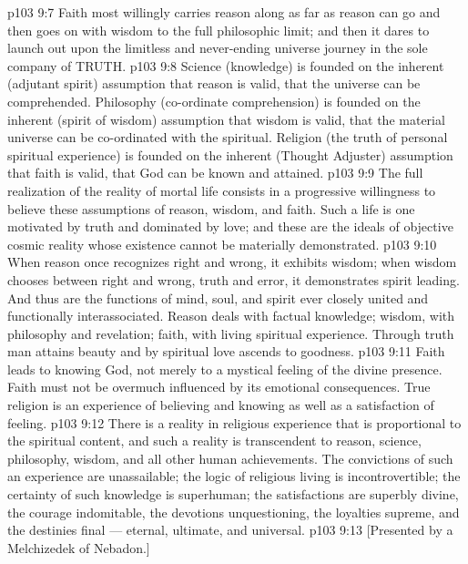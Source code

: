 \vs p103 9:7 Faith most willingly carries reason along as far as reason can go and then goes on with wisdom to the full philosophic limit; and then it dares to launch out upon the limitless and never\hyp{}ending universe journey in the sole company of TRUTH.
\vs p103 9:8 \pc Science (knowledge) is founded on the inherent (adjutant spirit) assumption that reason is valid, that the universe can be comprehended. Philosophy (co\hyp{}ordinate comprehension) is founded on the inherent (spirit of wisdom) assumption that wisdom is valid, that the material universe can be co\hyp{}ordinated with the spiritual. Religion (the truth of personal spiritual experience) is founded on the inherent (Thought Adjuster) assumption that faith is valid, that God can be known and attained.
\vs p103 9:9 The full realization of the reality of mortal life consists in a progressive willingness to believe these assumptions of reason, wisdom, and faith. Such a life is one motivated by truth and dominated by love; and these are the ideals of objective cosmic reality whose existence cannot be materially demonstrated.
\vs p103 9:10 When reason once recognizes right and wrong, it exhibits wisdom; when wisdom chooses between right and wrong, truth and error, it demonstrates spirit leading. And thus are the functions of mind, soul, and spirit ever closely united and functionally interassociated. Reason deals with factual knowledge; wisdom, with philosophy and revelation; faith, with living spiritual experience. Through truth man attains beauty and by spiritual love ascends to goodness.
\vs p103 9:11 Faith leads to knowing God, not merely to a mystical feeling of the divine presence. Faith must not be overmuch influenced by its emotional consequences. True religion is an experience of believing and knowing as well as a satisfaction of feeling.
\vs p103 9:12 \pc There is a reality in religious experience that is proportional to the spiritual content, and such a reality is transcendent to reason, science, philosophy, wisdom, and all other human achievements. The convictions of such an experience are unassailable; the logic of religious living is incontrovertible; the certainty of such knowledge is superhuman; the satisfactions are superbly divine, the courage indomitable, the devotions unquestioning, the loyalties supreme, and the destinies final --- eternal, ultimate, and universal.
\vsetoff
\vs p103 9:13 [Presented by a Melchizedek of Nebadon.]
